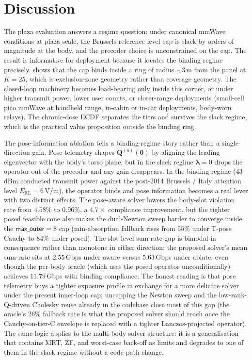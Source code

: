 \documentclass[journal,twocolumn,10pt]{IEEEtran}
\theoremstyle{plain}
\theoremstyle{remark}
\newcommand{\Qmat}{\mathbf{Q}}
\begin{document}
\section{Discussion}\label{sec:discussion}

The plaza evaluation answers a regime question: under canonical
mmWave conditions at plaza scale, the Brussels reference-level cap
is slack by orders of magnitude at the body, and the precoder choice
is unconstrained on the cap. The result is informative for
deployment because it locates the binding regime precisely.
 shows that the cap binds inside a ring of radius
$\sim 3$\,m from the panel at $K = 25$, which is exclusion-zone
geometry rather than coverage geometry. The closed-loop machinery
becomes load-bearing only inside this corner, or under higher
transmit power, lower user counts, or closer-range deployments
(small-cell pico mmWave at handheld range, in-cabin or in-car
deployments, body-worn relays). The chronic-dose ECDF separates
the tiers and survives the slack regime, which is the practical
value proposition outside the binding ring.

The pose-information ablation tells a binding-regime story rather
than a single-direction gain. Pose telemetry shapes
$\Qmat^{(u)}(\bm\theta)$ by aligning the leading eigenvector with
the body's torso plane, but in the slack regime $\bm\lambda = 0$
drops the operator out of the precoder and any gain disappears. In
the binding regime ($43\,$dBm conducted transmit power against the
post-2014 Brussels / Italy attention level $E_{\mathrm{RL}} =
6\,$V/m), the operator binds and pose information becomes a real
lever with two distinct effects. The pose-aware solver lowers the
body-slot violation rate from $4.58\%$ to $0.96\%$, a $4.7\times$
compliance improvement, but the tighter posed feasible cone also
makes the dual-Newton sweep harder to converge inside the
$\textsf{max\_outer} = 8$ cap (min-absorption fallback rises from
$55\%$ under T-pose Cauchy to $84\%$ under posed). The slot-level
sum-rate gap is bimodal in consequence rather than monotone in
either direction; the proposed solver's mean sum-rate sits at
$2.55\,$Gbps under aware versus $5.63\,$Gbps under ablate, even
though the per-body oracle (which uses the posed operator
unconditionally) achieves $11.79\,$Gbps with binding compliance.
The honest reading is that pose telemetry buys a tighter exposure
profile in exchange for a more delicate solver under the present
inner-loop cap; uncapping the Newton sweep and the
low-rank-Q-driven Cholesky reuse already in the codebase close most
of this gap (the oracle's $26\%$ fallback rate is what the proposed
solver should reach once the Cauchy-on-tier-C envelope is replaced
with a tighter Lanczos-projected operator). The same logic applies
to the multi-body solver structure: it is a generalisation that
contains MRT, ZF, and worst-case back-off as limits and degrades to
one of them in the slack regime without a code path change.
\end{document}
